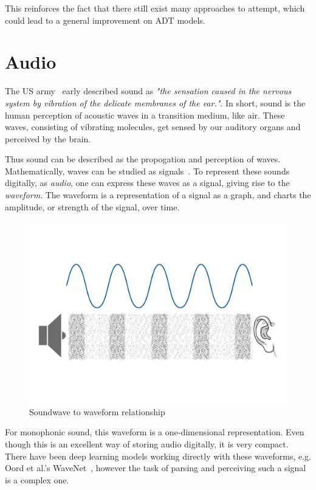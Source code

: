 This reinforces the fact that there still exist many approaches to attempt, which could lead to a general improvement on \gls{ADT} models.

\section{Audio}

The US army~\cite{1953fundamentals} early described sound as \textit{"the sensation caused in the nervous system by vibration of the delicate membranes of the ear."}. In short, sound is the human perception of acoustic waves in a transition medium, like air. These waves, consisting of vibrating molecules, get sensed by our auditory organs and perceived by the brain. 

Thus sound can be described as the propogation and perception of waves. Mathematically, waves can be studied as signals~\cite{8454362}. To represent these sounds digitally, as \textit{audio}, one can express these waves as a signal, giving rise to the \textit{waveform}. The waveform is a representation of a signal as a graph, and charts the amplitude, or strength of the signal, over time.

\begin{figure}[H]
    \centering
    \includegraphics[scale=0.3]{figures/waveform}
    \caption{Soundwave to waveform relationship}
    \label{WaveformFigure}
\end{figure}

For monophonic sound, this waveform is a one-dimensional representation. Even though this is an excellent way of storing audio digitally, it is very compact. There have been deep learning models working directly with these waveforms, e.g. Oord et al.'s WaveNet~\cite{oord2016wavenetgenerativemodelraw}, however the task of parsing and perceiving such a signal is a complex one.

